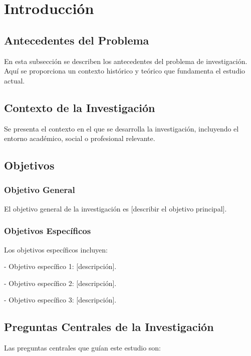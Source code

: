 \section{Introducción}
\label{sec:introduccion}

\subsection{Antecedentes del Problema}

En esta subsección se describen los antecedentes del problema de investigación. Aquí se proporciona un contexto histórico y teórico que fundamenta el estudio actual.

\subsection{Contexto de la Investigación}

Se presenta el contexto en el que se desarrolla la investigación, incluyendo el entorno académico, social o profesional relevante.

\subsection{Objetivos}

\subsubsection{Objetivo General}

El objetivo general de la investigación es [describir el objetivo principal].

\subsubsection{Objetivos Específicos}

Los objetivos específicos incluyen:

- Objetivo específico 1: [descripción].

- Objetivo específico 2: [descripción].

- Objetivo específico 3: [descripción].

\subsection{Preguntas Centrales de la Investigación}

Las preguntas centrales que guían este estudio son:

